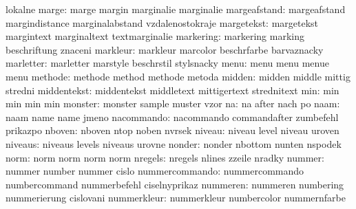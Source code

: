                        lokalne
               marge:  marge                margin               marginalie
                       marginalie
        margeafstand:  margeafstand         margindistance       marginalabstand
                       vzdalenostokraje
          margetekst:  margetekst           margintext           marginaltext
                       textmarginalie 
           markering:  markering            marking              beschriftung
                       znaceni
            markleur:  markleur             marcolor             beschrfarbe
                       barvaznacky
           marletter:  marletter            marstyle             beschrstil
                       stylsnacky
                menu:  menu                 menu                 menue
                       menu
             methode:  methode              method               methode
                       metoda
              midden:  midden               middle               mittig
                       stredni
         middentekst:  middentekst          middletext           mittigertext
                       strednitext
                 min:  min                  min                  min
                       min
             monster:  monster              sample               muster
                       vzor
                  na:  na                   after                nach
                       po
                naam:  naam                 name                 name
                       jmeno
          nacommando:  nacommando           commandafter         zumbefehl
                       prikazpo
              nboven:  nboven               ntop                 noben
                       nvrsek
              niveau:  niveau               level                niveau
                       uroven
             niveaus:  niveaus              levels               niveaus
                       urovne
              nonder:  nonder               nbottom              nunten
                       nspodek
                norm:  norm                 norm                 norm
                       norm
             nregels:  nregels              nlines               zzeile
                       nradky
              nummer:  nummer               number               nummer
                       cislo
      nummercommando:  nummercommando       numbercommand        nummerbefehl
                       ciselnyprikaz
            nummeren:  nummeren             numbering            nummerierung
                       cislovani
         nummerkleur:  nummerkleur          numbercolor          nummernfarbe
